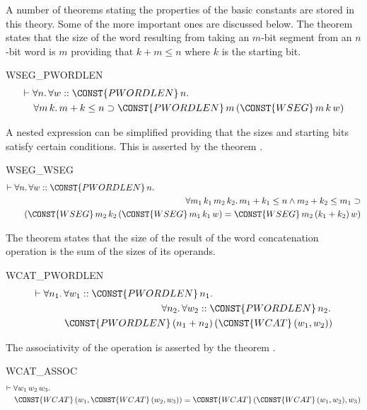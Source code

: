 A number of theorems stating the properties of the basic constants are
stored in this theory. Some of the more important ones are discussed below.
The theorem  states that the size of the
word resulting from taking an $m$-bit segment from an $n$-bit word is $m$
providing that $k + m \leq n$ where $k$ is the starting bit.
\begin{holthm}{WSEG_PWORDLEN}
\begin{eqnarray*}
\lefteqn{\THM \FORALL n\DOT \FORALL w ::\CONST{PWORDLEN} \,n\DOT} \\
 & & {}\FORALL m \,k\DOT m + k \LEE  n \IMP 
           \CONST{PWORDLEN} \,m \,(\CONST{WSEG} \,m \,k \,w)
\end{eqnarray*}
\end{holthm}
A nested  expression can be simplified providing that the
sizes and starting bits satisfy certain conditions. This is asserted
by the theorem .
\begin{holthm}{WSEG_WSEG}
\begin{eqnarray*}
\lefteqn{\THM \FORALL n\DOT \FORALL w ::\CONST{PWORDLEN} \,n\DOT} \\
 & & {}\FORALL m_{1} \,k_{1} \,m_{2} \,k_{2}\DOT
                     m_{1} + k_{1} \LEE  n \AND 
                     m_{2} + k_{2} \LEE  m_{1} \IMP  \\
 & & \quad (\CONST{WSEG} \,m_{2} \,k_{2}
                            \,(\CONST{WSEG} \,m_{1} \,k_{1} \,w) =
                            \CONST{WSEG} \,m_{2} \,(k_{1} + k_{2})
                               \,w)
\end{eqnarray*}
\end{holthm}
The theorem  states that the size of the result
of the word concatenation operation is the sum of the sizes of its
operands.
\begin{holthm}{WCAT_PWORDLEN}
\begin{eqnarray*}
\lefteqn{\THM \FORALL n_{1}\DOT \FORALL w_1 :: \CONST{PWORDLEN} \,n_{1}\DOT}\\
 & & \quad \FORALL n_{2}\DOT \FORALL w_2 :: \CONST{PWORDLEN} \,n_{2}\DOT \\
 & & \qquad \CONST{PWORDLEN} \,(n_{1} + n_{2})
                                 \,(\CONST{WCAT} \,(w_{1},w_{2}))
\end{eqnarray*}
\end{holthm}
The associativity of the  operation  is asserted by the
theorem .
\begin{holthm}{WCAT_ASSOC}
\begin{eqnarray*}
\lefteqn{\THM \FORALL w_{1} \,w_{2} \,w_{3}\DOT} \\
 & &        \CONST{WCAT} \,(w_{1},\CONST{WCAT} \,(w_{2},w_{3})) =
           \CONST{WCAT} \,(\CONST{WCAT} \,(w_{1},w_{2}),w_{3})
\end{eqnarray*}
\end{holthm}
